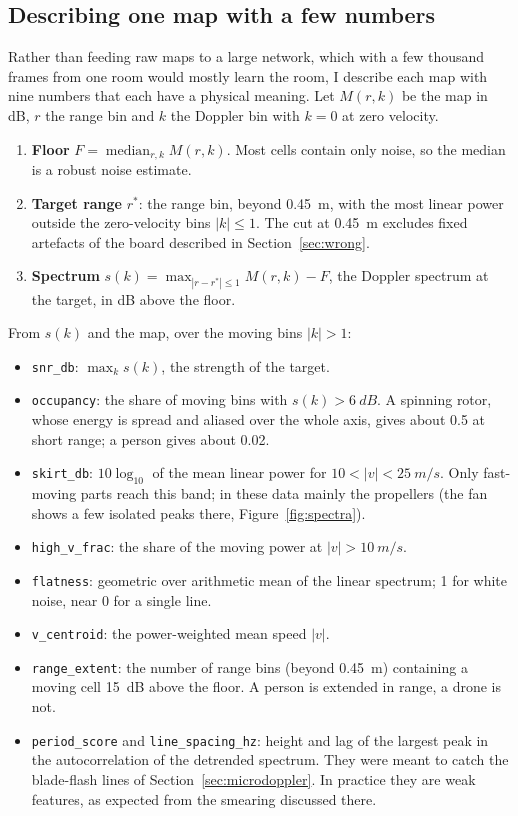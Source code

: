 \documentclass[11pt,a4paper]{article}
\begin{document}
\subsection{Describing one map with a few numbers}\label{sec:features}

Rather than feeding raw maps to a large network, which with a few thousand frames from one room would mostly learn the room, I describe each map with nine numbers that each have a physical meaning. Let $M(r,k)$ be the map in dB, $r$ the range bin and $k$ the Doppler bin with $k=0$ at zero velocity.
\begin{enumerate}
\item \textbf{Floor} $F = \operatorname{median}_{r,k} M(r,k)$. Most cells contain only noise, so the median is a robust noise estimate.
\item \textbf{Target range} $r^\ast$: the range bin, beyond \SI{0.45}{m}, with the most linear power outside the zero-velocity bins $|k| \le 1$. The cut at \SI{0.45}{m} excludes fixed artefacts of the board described in Section~\ref{sec:wrong}.
\item \textbf{Spectrum} $s(k) = \max_{|r-r^\ast| \le 1} M(r,k) - F$, the Doppler spectrum at the target, in dB above the floor.
\end{enumerate}
From $s(k)$ and the map, over the moving bins $|k| > 1$:
\begin{itemize}
\item \texttt{snr\_db}: $\max_k s(k)$, the strength of the target.
\item \texttt{occupancy}: the share of moving bins with $s(k) > \SI{6}{dB}$. A spinning rotor, whose energy is spread and aliased over the whole axis, gives about 0.5 at short range; a person gives about 0.02.
\item \texttt{skirt\_db}: $10\log_{10}$ of the mean linear power for $10 < |v| < \SI{25}{m/s}$. Only fast-moving parts reach this band; in these data mainly the propellers (the fan shows a few isolated peaks there, Figure~\ref{fig:spectra}).
\item \texttt{high\_v\_frac}: the share of the moving power at $|v| > \SI{10}{m/s}$.
\item \texttt{flatness}: geometric over arithmetic mean of the linear spectrum; 1 for white noise, near 0 for a single line.
\item \texttt{v\_centroid}: the power-weighted mean speed $|v|$.
\item \texttt{range\_extent}: the number of range bins (beyond \SI{0.45}{m}) containing a moving cell \SI{15}{dB} above the floor. A person is extended in range, a drone is not.
\item \texttt{period\_score} and \texttt{line\_spacing\_hz}: height and lag of the largest peak in the autocorrelation of the detrended spectrum. They were meant to catch the blade-flash lines of Section~\ref{sec:microdoppler}. In practice they are weak features, as expected from the smearing discussed there.
\end{itemize}
\end{document}
